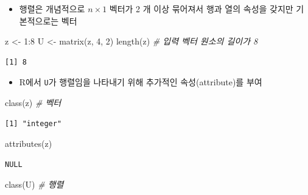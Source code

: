 \documentclass[
  11pt,
]{krantz}
\newenvironment{Shaded}{\begin{snugshade}}{\end{snugshade}}
\newcommand{\CommentTok}[1]{\textcolor[rgb]{0.37,0.37,0.37}{\textit{#1}}}
\newcommand{\DecValTok}[1]{\textcolor[rgb]{0.06,0.06,0.06}{#1}}
\newcommand{\FunctionTok}[1]{\textcolor[rgb]{0,0,0}{#1}}
\newcommand{\NormalTok}[1]{#1}
\newcommand{\OtherTok}[1]{\textcolor[rgb]{0.37,0.37,0.37}{#1}}
\newcommand{\SpecialCharTok}[1]{\textcolor[rgb]{0,0,0}{#1}}
\providecommand{\tightlist}{%
  \setlength{\itemsep}{0pt}\setlength{\parskip}{0pt}}
\begin{document}
\begin{itemize}
\tightlist
\item
  행렬은 개념적으로 \(n \times 1\) 벡터가 2 개 이상 묶어져서 행과 열의 속성을 갖지만 기본적으로는 벡터
\end{itemize}

\footnotesize

\begin{Shaded}
\begin{Highlighting}[]
\NormalTok{z }\OtherTok{\textless{}{-}} \DecValTok{1}\SpecialCharTok{:}\DecValTok{8}
\NormalTok{U }\OtherTok{\textless{}{-}} \FunctionTok{matrix}\NormalTok{(z, }\DecValTok{4}\NormalTok{, }\DecValTok{2}\NormalTok{)}
\FunctionTok{length}\NormalTok{(z) }\CommentTok{\# 입력 벡터 원소의 길이가 8}
\end{Highlighting}
\end{Shaded}

\begin{verbatim}
[1] 8
\end{verbatim}

\normalsize

\begin{itemize}
\tightlist
\item
  R에서 \texttt{U}가 행렬임을 나타내기 위해 추가적인 속성(attribute)를 부여
\end{itemize}

\footnotesize

\begin{Shaded}
\begin{Highlighting}[]
\FunctionTok{class}\NormalTok{(z) }\CommentTok{\# 벡터}
\end{Highlighting}
\end{Shaded}

\begin{verbatim}
[1] "integer"
\end{verbatim}

\begin{Shaded}
\begin{Highlighting}[]
\FunctionTok{attributes}\NormalTok{(z)}
\end{Highlighting}
\end{Shaded}

\begin{verbatim}
NULL
\end{verbatim}

\begin{Shaded}
\begin{Highlighting}[]
\FunctionTok{class}\NormalTok{(U) }\CommentTok{\# 행렬}
\end{Highlighting}
\end{Shaded}
\end{document}

